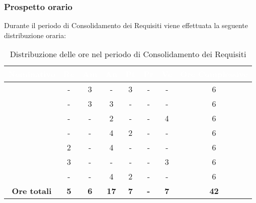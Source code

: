 \subsubsection{Prospetto orario}
Durante il periodo di Consolidamento dei Requisiti viene effettuata la seguente distribuzione oraria:
\begin{table}[H]
	\begin{center}
		\begin{tabular}{ |c c c c c c c c| }
		\rowcolor{darkblue} 
		\textcolor{white}{\textbf{Nominativo}} & \textcolor{white}{\textbf{Re}} & \textcolor{white}{\textbf{Am}} & \textcolor{white}{\textbf{An}} & \textcolor{white}{\textbf{Pt}} & \textcolor{white}{\textbf{Pr}} & \textcolor{white}{\textbf{Ve}} & \textcolor{white}{\textbf{Ore Complessive}} \\ \hline
		\BL 	& - 	& 3  	& - 	& 3 	& - 	& - 	& 6 \\ \hline
		\FF 	& - 	& 3  	& 3 	& - 	& - 	& -  	& 6 \\ \hline
		\MM 	& -  	& -  	& 2 	& - 	& - 	& 4  	& 6 \\ \hline
		\PC 	& - 	& -  	& 4 	& 2 	& - 	& - 	& 6 \\ \hline
		\TG 	& 2  	& - 	& 4 	& - 	& - 	& - 	& 6 \\ \hline
		\TL 	& 3  	& - 	& - 	& - 	& - 	& 3 	& 6 \\ \hline
		\VD 	& -  	& -  	& 4 	& 2 	& - 	& -  	& 6 \\ \hline
		\textbf{Ore totali} & \textbf{5} & \textbf{6} & \textbf{17} & \textbf{7} & \textbf{-} & \textbf{7} & \textbf{42} \\ \hline
		\end{tabular}
	\caption{Distribuzione delle ore nel periodo di Consolidamento dei Requisiti}
	\end{center}
\end{table}

